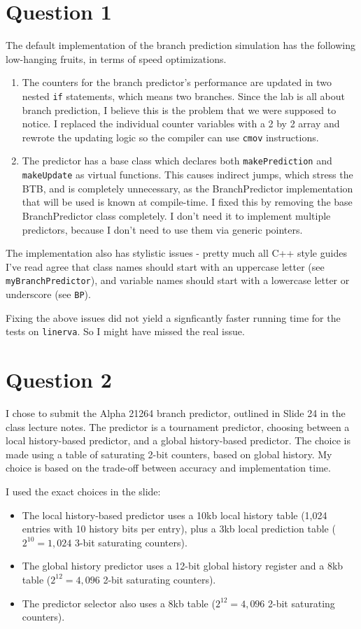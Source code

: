 \section{Question 1}
The default implementation of the branch prediction simulation has the
following low-hanging fruits, in terms of speed optimizations.
\begin{enumerate}
  \item The counters for the branch predictor's performance are updated in two
  nested \texttt{if} statements, which means two branches. Since the lab is all
  about branch prediction, I believe this is the problem that we were supposed
  to notice. I replaced the individual counter variables with a 2 by 2 array
  and rewrote the updating logic so the compiler can use \texttt{cmov}
  instructions.
  \item The predictor has a base class which declares both
  \texttt{makePrediction} and \texttt{makeUpdate} as virtual functions. This
  causes indirect jumps, which stress the BTB, and is completely unnecessary,
  as the BranchPredictor implementation that will be used is known at
  compile-time. I fixed this by removing the base BranchPredictor class
  completely. I don't need it to implement multiple predictors, because I don't
  need to use them via generic pointers.
\end{enumerate} 

The implementation also has stylistic issues - pretty much all C++ style guides
I've read agree that class names should start with an uppercase letter
(see \texttt{myBranchPredictor}), and variable names should start with
a lowercase letter or underscore (see \texttt{BP}).

Fixing the above issues did not yield a signficantly faster running time for
the tests on \texttt{linerva}. So I might have missed the real issue.

\section{Question 2}
I chose to submit the Alpha 21264 branch predictor, outlined in Slide 24 in the
class lecture notes. The predictor is a tournament predictor, choosing between
a local history-based predictor, and a global history-based predictor. The
choice is made using a table of saturating 2-bit counters, based on global
history. My choice is based on the trade-off between accuracy and implementation
time.

I used the exact choices in the slide:
\begin{itemize}
  \item The local history-based predictor uses a 10kb local history table
  (1,024 entries with 10 history bits per entry), plus a 3kb local prediction
  table ($2^{10} = 1,024$ 3-bit saturating counters).
  \item The global history predictor uses a 12-bit global history register and
  a 8kb table ($2^{12} = 4,096$ 2-bit saturating counters).
  \item The predictor selector also uses a 8kb table ($2^{12} = 4,096$ 2-bit
  saturating counters).
\end{itemize}

